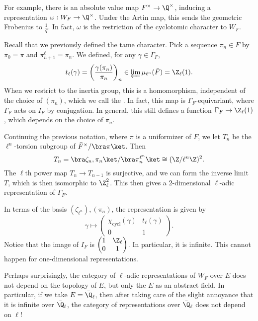 \documentclass[a4paper]{article}
\begin{document}
For example, there is an absolute value map $F^\times \to \Q^\times$, inducing a representation $\omega: W_F \to \Q^\times$. Under the Artin map, this sends the geometric Frobenius to $\frac{1}{q}$. In fact, $\omega$ is the restriction of the cyclotomic character to $W_F$.
%

Recall that we previously defined the tame character. Pick a sequence $\pi_n \in \bar{F}$ by $\pi_0 = \pi$ and $\pi_{n + 1}^\ell = \pi_n$. We defined, for any $\gamma \in \Gamma_F$,
\[
  t_\ell(\gamma) = \left(\frac{\gamma(\pi_n)}{\pi_n}\right)_n \in \varprojlim \mu_{\ell^n} (\bar{F}) = \Z_\ell(1).
\]
When we restrict to the inertia group, this is a homomorphism, independent of the choice of $(\pi_n)$, which we call the . In fact, this map is $\Gamma_F$-equivariant, where $\Gamma_F$ acts on $I_F$ by conjugation. In general, this still defines a function $\Gamma_F \to \Z_\ell(1)$, which depends on the choice of $\pi_n$.

\begin{eg}
  Continuing the previous notation, where $\pi$ is a uniformizer of $F$, we let $T_n$ be the $\ell^n$-torsion subgroup of $\bar{F}^\times/\bra \pi\ket$. Then
  \[
    T_n = \bra \zeta_n, \pi_n\ket / \bra \pi_n^{\ell^n}\ket \cong (\Z/\ell^n \Z)^2.
  \]
  The $\ell$th power map $T_n \to T_{n - 1}$ is surjective, and we can form the inverse limit $T$, which is then isomorphic to $\Z_{\ell}^2$. This then gives a $2$-dimensional $\ell$-adic representation of $\Gamma_F$.

  In terms of the basis $(\zeta_{\ell^n}), (\pi_n)$, the representation is given by
  \[
    \gamma \mapsto
    \begin{pmatrix}
      \chi_{\mathrm{cycl}}(\gamma) & t_\ell(\gamma)\\
      0 & 1
    \end{pmatrix}.
  \]
  Notice that the image of $I_F$ is $\begin{pmatrix} 1 & \Z_\ell \\0 & 1\end{pmatrix}$. In particular, it is infinite. This cannot happen for one-dimensional representations.
\end{eg}
Perhaps surprisingly, the category of $\ell$-adic representations of $W_F$ over $E$ does not depend on the topology of $E$, but only the $E$ as an abstract field. In particular, if we take $E = \bar{\Q}_\ell$, then after taking care of the slight annoyance that it is infinite over $\bar{\Q}_{\ell}$, the category of representations over $\bar{\Q}_{\ell}$ does not depend on $\ell$!
\end{document}
